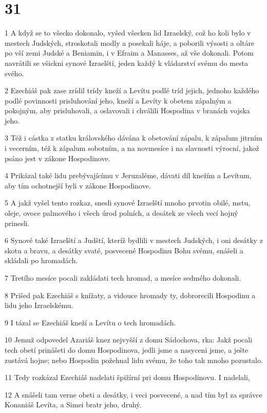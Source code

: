 \chapter{31}

\par 1 A když se to všecko dokonalo, vyšed všecken lid Izraelský, což ho koli bylo v mestech Judských, stroskotali modly a posekali háje, a poborili výsosti a oltáre po vší zemi Judské a Beniamin, i v Efraim a Manasses, až vše dokonali. Potom navrátili se všickni synové Izraelští, jeden každý k vládarství svému do mesta svého.
\par 2 Ezechiáš pak zase zrídil trídy kneží a Levítu podlé tríd jejich, jednoho každého podlé povinnosti prisluhování jeho, kneží a Levíty k obetem zápalným a pokojným, aby prisluhovali, a oslavovali i chválili Hospodina v branách vojska jeho.
\par 3 Též i cástka z statku královského dávána k obetování zápalu, k zápalum jitrním i vecerním, též k zápalum sobotním, a na novmesíce i na slavnosti výrocní, jakož psáno jest v zákone Hospodinove.
\par 4 Prikázal také lidu prebývajícímu v Jeruzaléme, dávati díl knežím a Levítum, aby tím ochotnejší byli v zákone Hospodinove.
\par 5 A jakž vyšel tento rozkaz, snesli synové Izraelští mnoho prvotin obilé, mstu, oleje, ovoce palmového i všech úrod polních, a desátek ze všech vecí hojný prinesli.
\par 6 Synové také Izraelští a Judští, kteríž bydlili v mestech Judských, i oni desátky z skotu a bravu, a desátky svaté, posvecené Hospodinu Bohu svému, snášeli a skládali po hromadách.
\par 7 Tretího mesíce pocali zakládati tech hromad, a mesíce sedmého dokonali.
\par 8 Prišed pak Ezechiáš s knížaty, a vidouce hromady ty, dobrorecili Hospodinu a lidu jeho Izraelskému.
\par 9 I tázal se Ezechiáš kneží a Levítu o tech hromadách.
\par 10 Jemuž odpovedel Azariáš knez nejvyšší z domu Sádochova, rka: Jakž pocali tech obetí prinášeti do domu Hospodinova, jedli jsme a nasyceni jsme, a ješte zustává hojne; nebo Hospodin požehnal lidu svému, že toho tak mnoho pozustalo.
\par 11 Tedy rozkázal Ezechiáš nadelati špižírní pri domu Hospodinovu. I nadelali,
\par 12 A snášeli tam verne obeti a desátky, i veci posvecené, a nad tím byl za správce Konaniáš Levíta, a Simei bratr jeho, druhý.
